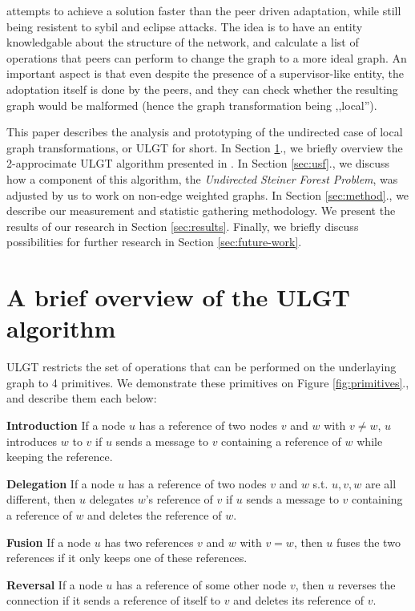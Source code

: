 \documentclass{article}
\begin{document}
\cite{ulgt} attempts to achieve a solution faster than the peer driven adaptation, while still being resistent to sybil and eclipse attacks. The idea is to have an entity knowledgable about the structure of the network, and calculate a list of operations that peers can perform to change the graph to a more ideal graph. An important aspect is that even despite the presence of a supervisor-like entity, the adoptation itself is done by the peers, and they can check whether the resulting graph would be malformed (hence the graph transformation being ,,local'').

This paper describes the analysis and prototyping of the undirected case of local graph transformations, or ULGT for short. In Section \ref{sec:ulgt}., we briefly overview the 2-approcimate ULGT algorithm presented in \cite{ulgt}. In Section \ref{sec:usf}., we discuss how a component of this algorithm, the \textit{Undirected Steiner Forest Problem}, was adjusted by us to work on non-edge weighted graphs. In Section \ref{sec:method}., we describe our measurement and statistic gathering methodology. We present the results of our research in Section \ref{sec:results}. Finally, we briefly discuss possibilities for further research in Section \ref{sec:future-work}.

\section{A brief overview of the ULGT algorithm}
\label{sec:ulgt}

ULGT restricts the set of operations that can be performed on the underlaying graph to 4 primitives. We demonstrate these primitives on Figure \ref{fig:primitives}., and describe them each below:

\textbf{Introduction} If a node $u$ has a reference of two nodes $v$ and $w$ with $v \neq w$, $u$ introduces $w$
to $v$ if $u$ sends a message to $v$ containing a reference of $w$ while keeping the reference.

\textbf{Delegation} If a node $u$ has a reference of two nodes $v$ and $w$ s.t. $u, v, w$ are all different,
then $u$ delegates $w$’s reference of $v$ if $u$ sends a message to $v$ containing a reference of $w$
and deletes the reference of $w$.

\textbf{Fusion} If a node $u$ has two references $v$ and $w$ with $v = w$, then $u$ fuses the two references
if it only keeps one of these references.

\textbf{Reversal} If a node $u$ has a reference of some other node $v$, then $u$ reverses the connection
if it sends a reference of itself to $v$ and deletes its reference of $v$.
\end{document}
